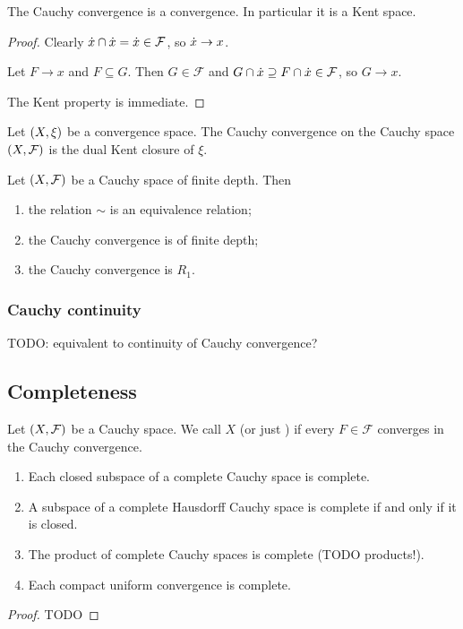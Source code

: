 \begin{lemma}
The Cauchy convergence is a convergence. In particular it is a Kent space.
\end{lemma}
\begin{proof}
Clearly $\dot{x}\cap\dot{x} = \dot{x} \in \mathcal{F}$, so $\dot{x} \to x$.

Let $F\to x$ and $F\subseteq G$. Then $G\in \mathcal{F}$ and $G\cap \dot{x} \supseteq F \cap\dot{x} \in \mathcal{F}$, so $G \to x$.

The Kent property is immediate.
\end{proof}

\begin{lemma}
Let $\left( X,\xi \right)$ be a convergence space. The Cauchy convergence on the Cauchy space $\left( X,\mathcal{F} \right)$ is the dual Kent closure of $\xi$.
\end{lemma}

\begin{proposition}
Let $\left( X, \mathcal{F} \right)$ be a Cauchy space of finite depth. Then
\begin{enumerate}
\item the relation $\sim$ is an equivalence relation;
\item the Cauchy convergence is of finite depth;
\item the Cauchy convergence is $R_1$.
\end{enumerate}
\end{proposition}

\subsubsection{Cauchy continuity}
TODO: equivalent to continuity of Cauchy convergence?

\subsection{Completeness}
\begin{definition}
Let $\left( X, \mathcal{F} \right)$ be a Cauchy space. We call $X$  (or just ) if every $F\in \mathcal{F}$ converges in the Cauchy convergence.
\end{definition}

\begin{proposition}
\begin{enumerate}
\item Each closed subspace of a complete Cauchy space is complete.
\item A subspace of a complete Hausdorff Cauchy space is complete \textup{if and only if} it is closed.
\item The product of complete Cauchy spaces is complete (TODO products!).
\item Each compact uniform convergence is complete.
\end{enumerate}
\end{proposition}
\begin{proof}
TODO
\end{proof}

